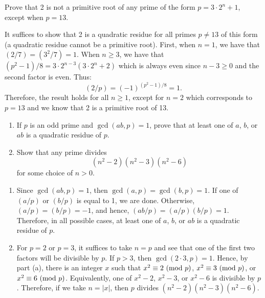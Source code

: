 \begin{exercise}
    Prove that 2 is not a primitive root of any prime of the form $p = 3\cdot 2^n + 1$, except when $p = 13$.  \\
\end{exercise}

\begin{solution}
    It suffices to show that 2 is a quadratic residue for all primes $p\neq 13$ of this form (a quadratic residue cannot be a primitive root). First, when $n = 1$, we have that $(2/7) = (3^2/7) = 1$. When $n \geq 3$, we have that $(p^2 - 1)/8 = 3\cdot 2^{n-3} (3 \cdot 2^n + 2)$ which is always even since $n-3 \geq 0$ and the second factor is even. Thus:
    $$(2/p) = (-1)^{(p^2-1)/8} = 1.$$
    Therefore, the result holds for all $n \geq 1$, except for $n = 2$ which corresponds to $p = 13$ and we know that 2 is a primitive root of 13. \\
\end{solution}

\begin{exercise}
    \begin{enumerate}
        \item If $p$ is an odd prime and $\gcd(ab, p) = 1$, prove that at least one of $a$, $b$, or $ab$ is a quadratic residue of $p$.
        \item Show that any prime divides
        $$(n^2 - 2)(n^2 - 3)(n^2 - 6)$$
        for some choice of $n > 0$. \\
    \end{enumerate}
\end{exercise}

\begin{solution}
    \begin{enumerate}
        \item Since $\gcd(ab, p) = 1$, then $\gcd(a,p) = \gcd(b,p) = 1$. If one of $(a/p)$ or $(b/p)$ is equal to 1, we are done. Otherwise, $(a/p) = (b/p) = -1$, and hence, $(ab/p) = (a/p)(b/p) = 1$. Therefore, in all possible cases, at least one of $a$, $b$, or $ab$ is a quadratic residue of $p$.
        \item For $p = 2$ or $p = 3$, it suffices to take $n = p$ and see that one of the first two factors will be divisible by $p$. If $p > 3$, then $\gcd(2\cdot 3, p) = 1$. Hence, by part (a), there is an integer $x$ such that $x^2 \equiv 2 \ (\mathrm{mod}\ p)$, $x^2 \equiv 3 \ (\mathrm{mod}\ p)$, or $x^2 \equiv 6 \ (\mathrm{mod}\ p)$. Equivalently, one of $x^2 - 2$, $x^2 - 3$, or $x^2 - 6$ is divisible by $p$. Therefore, if we take $n = |x|$, then $p$ divides $(n^2 - 2)(n^2 - 3)(n^2 - 6)$. \\
    \end{enumerate}
\end{solution}

